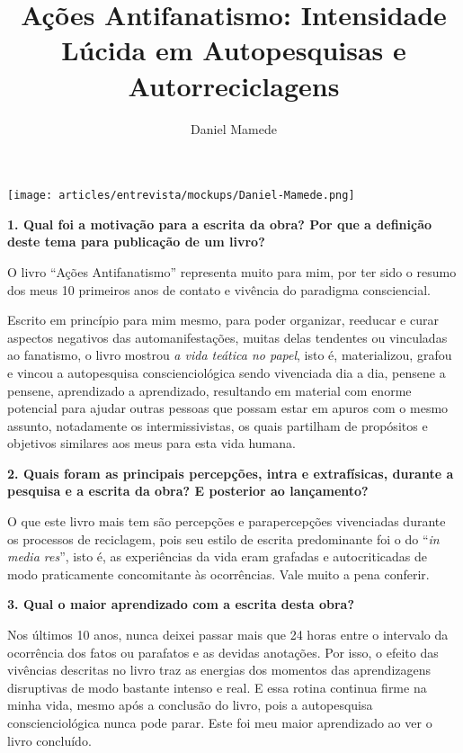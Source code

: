 \documentclass{gescons}
\author{Daniel Mamede}
\title{Ações Antifanatismo: Intensidade Lúcida em Autopesquisas e Autorreciclagens}
\begin{document}
    \makeentrevistatitle

    \begin{multicols}{2}

\begin{center}
    \texttt{[image: articles/entrevista/mockups/Daniel-Mamede.png]}
\end{center}


\textbf{1. Qual foi a motivação para a escrita da obra? Por que a definição deste tema para publicação de um livro?}

O livro “Ações Antifanatismo” representa muito para mim, por ter sido o resumo dos meus 10 primeiros anos de contato e vivência do paradigma consciencial. 

Escrito em princípio para mim mesmo, para poder organizar, reeducar e curar aspectos negativos das automanifestações, muitas delas tendentes ou vinculadas ao fanatismo, o livro mostrou \textit{a vida teática no papel}, isto é, materializou, grafou e vincou a autopesquisa conscienciológica sendo vivenciada dia a dia, pensene a pensene, aprendizado a aprendizado, resultando em material com enorme potencial para ajudar outras pessoas que possam estar em apuros com o mesmo assunto, notadamente os intermissivistas, os quais partilham de propósitos e objetivos similares aos meus para esta vida humana.



\textbf{2. Quais foram as principais percepções, intra e extrafísicas, durante a pesquisa e a escrita da obra? E posterior ao lançamento?}

O que este livro mais tem são percepções e parapercepções vivenciadas durante os processos de reciclagem, pois seu estilo de escrita predominante foi o do “\textit{in media res}”, isto é, as experiências da vida eram grafadas e autocriticadas de modo praticamente concomitante às ocorrências. Vale muito a pena conferir. 


\textbf{3.       Qual o maior aprendizado com a escrita desta obra?}

Nos últimos 10 anos, nunca deixei passar mais que 24 horas entre o intervalo da ocorrência dos fatos ou parafatos e as devidas anotações. Por isso, o efeito das vivências descritas no livro traz as energias dos momentos das aprendizagens disruptivas de modo bastante intenso e real. E essa rotina continua firme na minha vida, mesmo após a conclusão do livro, pois a autopesquisa conscienciológica nunca pode parar. Este foi meu maior aprendizado ao ver o livro concluído.


\end{multicols}
\end{document}
